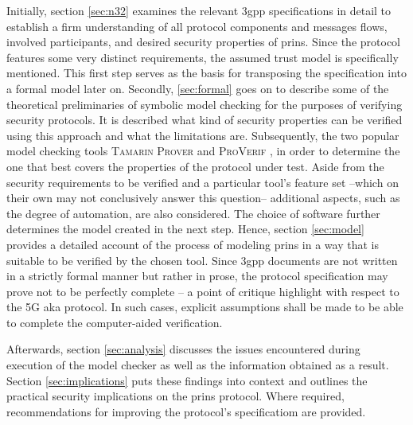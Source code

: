 Initially, section \ref{sec:n32} examines the relevant \gls{3gpp} specifications in detail to establish a firm understanding of all protocol components and messages flows, involved participants, and desired security properties of \gls{prins}.
Since the protocol features some very distinct requirements, the assumed trust model is specifically mentioned.
This first step serves as the basis for transposing the specification into a formal model later on.
Secondly, \ref{sec:formal} goes on to describe some of the theoretical preliminaries of symbolic model checking for the purposes of verifying security protocols.
It is described what kind of security properties can be verified using this approach and what the limitations are.
Subsequently, the two popular model checking tools \textsc{Tamarin Prover} and \textsc{ProVerif} , in order to determine the one that best covers the properties of the protocol under test.
Aside from the security requirements to be verified and a particular tool's feature set --which on their own may not conclusively answer this question-- additional aspects, such as the degree of automation, are also considered.
The choice of software further determines the model created in the next step.
Hence, section \ref{sec:model} provides a detailed account of the process of modeling \gls{prins} in a way that is suitable to be verified by the chosen tool.
Since \gls{3gpp} documents are not written in a strictly formal manner but rather in prose, the protocol specification may prove not to be perfectly complete -- a point of critique \cite{basin2018model} highlight with respect to the 5G \gls{aka} protocol.
In such cases, explicit assumptions shall be made to be able to complete the computer-aided verification.

Afterwards, section \ref{sec:analysis} discusses the issues encountered during execution of the model checker as well as the information obtained as a result.
Section \ref{sec:implications} puts these findings into context and outlines the practical security implications on the \gls{prins} protocol.
Where required, recommendations for improving the protocol's specificatiom are provided.

